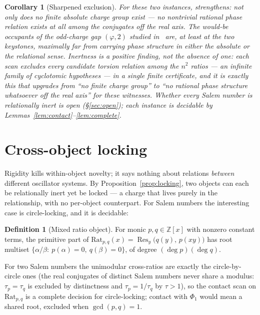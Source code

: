 \documentclass[11pt]{article}
\theoremstyle{plain}
\newtheorem{corollary}[theorem]{Corollary}
\theoremstyle{definition}
\newtheorem{definition}[theorem]{Definition}
\theoremstyle{remark}
\newcommand{\Z}{\mathbb{Z}}
\newcommand{\Rat}{\mathrm{Rat}}
\DeclareMathOperator{\Res}{Res}
\begin{document}
\begin{corollary}[Sharpened exclusion]\label{cor:sharpexcl}
For these two instances, \cite[Lem.~6.1]{CMC} strengthens: not only does no
finite absolute charge group exist --- no nontrivial rational phase relation
exists at all among the conjugates off the real axis. The would-be occupants of
the odd-charge gap $(\varphi,2)$ studied in~\cite[Thm.~6.2]{CMC} are, at least
at the two keystones, maximally far from carrying phase structure in either the
absolute or the relational sense. Inertness is a positive finding, not the
absence of one: each scan excludes \emph{every} candidate torsion relation
among the $n^2$ ratios --- an infinite family of cyclotomic hypotheses --- in
a single finite certificate, and it is exactly this that upgrades
\cite[Lem.~6.1]{CMC} from ``no finite charge group'' to ``no rational phase
structure whatsoever off the real axis'' for these witnesses. Whether
\emph{every} Salem number is relationally inert is open (\S\ref{sec:open});
each instance is decidable by
Lemmas~\ref{lem:contact}--\ref{lem:complete}.
\end{corollary}

\section{Cross-object locking}\label{sec:locking}

Rigidity kills within-object novelty; it says nothing about relations
\emph{between} different oscillator systems. By
Proposition~\ref{prop:locking}, two objects can each be relationally inert yet
be locked --- a charge that lives purely in the relationship, with no per-object
counterpart. For Salem numbers the interesting case is circle-locking, and it is
decidable:

\begin{definition}[Mixed ratio object]
For monic $p,q\in\Z[x]$ with nonzero constant terms, the primitive part of
$\Rat_{p,q}(x)=\Res_y\bigl(q(y),\,p(xy)\bigr)$ has root multiset
$\{\alpha/\beta:\ p(\alpha)=0,\ q(\beta)=0\}$, of degree $(\deg p)(\deg q)$.
\end{definition}

For two Salem numbers the unimodular cross-ratios are exactly the
circle-by-circle ones (the real conjugates of distinct Salem numbers never share
a modulus: $\tau_p=\tau_q$ is excluded by distinctness and
$\tau_p=1/\tau_q$ by $\tau>1$), so the contact scan on $\Rat_{p,q}$ is a
complete decision for circle-locking; contact with $\Phi_1$ would mean a shared
root, excluded when $\gcd(p,q)=1$.
\end{document}
